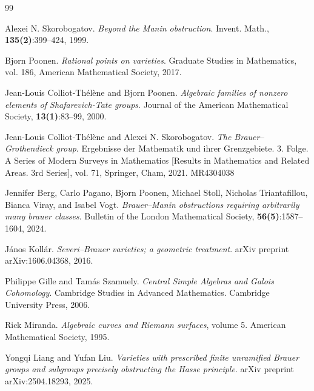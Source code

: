 \documentclass[11pt]{amsart}
\theoremstyle{plain}
\theoremstyle{definition}
\begin{document}
    
\begin{thebibliography}{99}

 Alexei N. Skorobogatov. \textit{Beyond the Manin obstruction}. Invent. Math., {\bf 135(2)}:399–424, 1999.

 Bjorn Poonen. \textit{Rational points on varieties}. Graduate Studies in Mathematics, vol. 186, American Mathematical Society, 2017.

 Jean-Louis Colliot-Thélène and Bjorn Poonen. \textit{Algebraic families of nonzero elements of Shafarevich-Tate groups}. Journal of the American Mathematical Society, {\bf 13(1)}:83–99, 2000.

 Jean-Louis Colliot-Thélène and Alexei N. Skorobogatov. \textit{The Brauer--Grothendieck group}. Ergebnisse der Mathematik und ihrer Grenzgebiete. 3. Folge. A Series of Modern Surveys in Mathematics [Results in Mathematics and Related Areas. 3rd Series], vol. 71, Springer, Cham, 2021. MR4304038

 Jennifer Berg, Carlo Pagano, Bjorn Poonen, Michael Stoll, Nicholas Triantafillou, Bianca Viray, and Isabel Vogt. \textit{Brauer--Manin obstructions requiring arbitrarily many brauer classes}. Bulletin of the London Mathematical Society, {\bf 56(5)}:1587–1604, 2024.

 János Kollár. \textit{Severi--Brauer varieties; a geometric treatment}. arXiv preprint arXiv:1606.04368, 2016.

 Philippe Gille and Tamás Szamuely. \textit{Central Simple Algebras and Galois Cohomology}. Cambridge Studies in Advanced Mathematics. Cambridge University Press, 2006.

 Rick Miranda. \textit{Algebraic curves and Riemann surfaces}, volume 5. American Mathematical Society, 1995.


 Yongqi Liang and Yufan Liu. \textit{Varieties with prescribed finite unramified Brauer groups and subgroups precisely obstructing the Hasse principle}. arXiv preprint arXiv:2504.18293, 2025.

\end{thebibliography}


	


    
\end{document}
